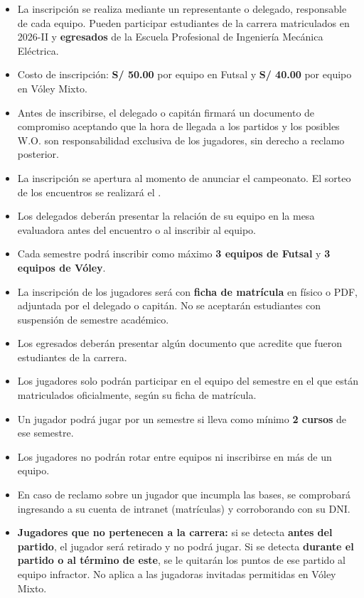 	\begin{itemize}
		\item La inscripción se realiza mediante un representante o delegado, responsable de cada equipo. Pueden participar estudiantes de la carrera matriculados en 2026-II y \textbf{egresados} de la Escuela Profesional de Ingeniería Mecánica Eléctrica.
		\item Costo de inscripción: \textbf{S/ 50.00} por equipo en Futsal y \textbf{S/ 40.00} por equipo en Vóley Mixto.
		\item Antes de inscribirse, el delegado o capitán firmará un documento de compromiso aceptando que la hora de llegada a los partidos y los posibles W.O. son responsabilidad exclusiva de los jugadores, sin derecho a reclamo posterior.
		\item La inscripción se apertura al momento de anunciar el campeonato. El sorteo de los encuentros se realizará el \textbf{\fechaSorteo}.
		\item Los delegados deberán presentar la relación de su equipo en la mesa evaluadora antes del encuentro o al inscribir al equipo.
		\item Cada semestre podrá inscribir como máximo \textbf{3 equipos de Futsal} y \textbf{3 equipos de Vóley}.
		\item La inscripción de los jugadores será con \textbf{ficha de matrícula} en físico o PDF, adjuntada por el delegado o capitán. No se aceptarán estudiantes con suspensión de semestre académico.
		\item Los egresados deberán presentar algún documento que acredite que fueron estudiantes de la carrera.
		\item Los jugadores solo podrán participar en el equipo del semestre en el que están matriculados oficialmente, según su ficha de matrícula.
		\item Un jugador podrá jugar por un semestre si lleva como mínimo \textbf{2 cursos} de ese semestre.
		\item Los jugadores no podrán rotar entre equipos ni inscribirse en más de un equipo.
		\item En caso de reclamo sobre un jugador que incumpla las bases, se comprobará ingresando a su cuenta de intranet (matrículas) y corroborando con su DNI.
		\item \textbf{Jugadores que no pertenecen a la carrera:} si se detecta \textbf{antes del partido}, el jugador será retirado y no podrá jugar. Si se detecta \textbf{durante el partido o al término de este}, se le quitarán los puntos de ese partido al equipo infractor. No aplica a las jugadoras invitadas permitidas en Vóley Mixto.
	\end{itemize}

